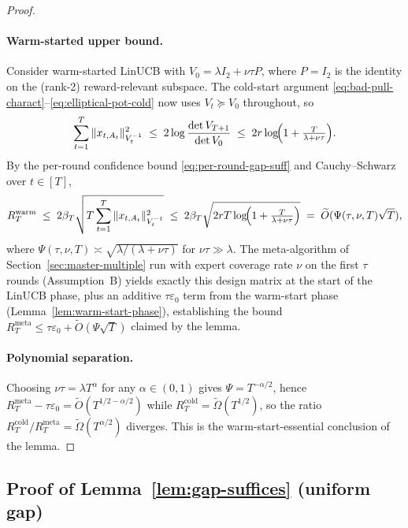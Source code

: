 \documentclass{article}
\theoremstyle{definition}
\theoremstyle{remark}
\theoremstyle{remark}
\begin{document}
\begin{proof}
\paragraph{Warm-started upper bound.}
Consider warm-started LinUCB with $V_0 = \lambda I_2 + \nu\tau P$,
where $P=I_2$ is the identity on the (rank-2) reward-relevant subspace.
The cold-start argument
\eqref{eq:bad-pull-charact}--\eqref{eq:elliptical-pot-cold} now uses
$V_t \succeq V_0$ throughout, so
\[
\sum_{t=1}^T\|x_{t,A_t}\|_{V_t^{-1}}^2
\;\le\; 2\log\frac{\det V_{T+1}}{\det V_0}
\;\le\; 2r\log\!\Bigl(1+\tfrac{T}{\lambda+\nu\tau}\Bigr).
\]
By the per-round confidence bound
\eqref{eq:per-round-gap-suff} and Cauchy--Schwarz over $t\in[T]$,
\[
R_T^{\mathrm{warm}}
\;\le\; 2\beta_T\sqrt{T\sum_{t=1}^T\|x_{t,A_t}\|_{V_t^{-1}}^2}
\;\le\;
2\beta_T\sqrt{2rT\log\!\Bigl(1+\tfrac{T}{\lambda+\nu\tau}\Bigr)}
\;=\;\widetilde O(\Psi(\tau,\nu,T)\sqrt T),
\]
where $\Psi(\tau,\nu,T)\asymp\sqrt{\lambda/(\lambda+\nu\tau)}$ for
$\nu\tau\gg\lambda$. The meta-algorithm of
Section~\ref{sec:master-multiple} run with expert coverage rate $\nu$
on the first $\tau$ rounds (Assumption~B) yields exactly this design
matrix at the start of the LinUCB phase, plus an additive
$\tau\varepsilon_0$ term from the warm-start phase
(Lemma~\ref{lem:warm-start-phase}), establishing the bound
$R_T^{\mathrm{meta}}\le\tau\varepsilon_0+\widetilde O(\Psi\sqrt T)$
claimed by the lemma.

\paragraph{Polynomial separation.}
Choosing $\nu\tau=\lambda T^\alpha$ for any $\alpha\in(0,1)$ gives
$\Psi = T^{-\alpha/2}$, hence $R_T^{\mathrm{meta}}-\tau\varepsilon_0 =
\widetilde O(T^{1/2-\alpha/2})$ while
$R_T^{\mathrm{cold}}=\widetilde\Omega(T^{1/2})$, so the ratio
$R_T^{\mathrm{cold}}/R_T^{\mathrm{meta}} = \widetilde\Omega(T^{\alpha/2})$
diverges. This is the warm-start-essential conclusion of the lemma.
\end{proof}



\subsection{Proof of Lemma~\ref{lem:gap-suffices} (uniform gap)}
\label{app:proof-gap-suffices}
\end{document}

